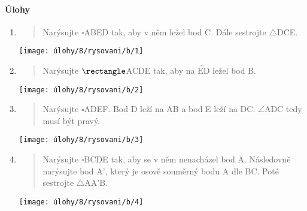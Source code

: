 \paragraph{Úlohy}
\begin{enumerate}
    \item
    \begin{minipage}[t]{\linewidth}
        \begin{quote}
            Narýsujte $\square$ABED tak, aby v něm ležel bod C. Dále sestrojte $\triangle$DCE\@.
        \end{quote}
        \centering
        \texttt{[image: úlohy/8/rysovani/b/1]}

    \end{minipage}

    \item
    \begin{minipage}[t]{\linewidth}
        \begin{quote}
            Narýsujte $\rectangle$ACDE tak, aby na $\overleftrightarrow{\text{ED}}$ ležel bod B\@.
        \end{quote}
        \centering
        \texttt{[image: úlohy/8/rysovani/b/2]}

    \end{minipage}

    \item
    \begin{minipage}[t]{\linewidth}
        \begin{quote}
            Narýsujte $\square$ADEF. Bod D leží na AB a bod E leží na DC. $\angle$ADC tedy musí být pravý.
        \end{quote}
        \centering
        \texttt{[image: úlohy/8/rysovani/b/3]}

    \end{minipage}

    \item
    \begin{minipage}[t]{\linewidth}
        \begin{quote}
            Narýsujte $\square$BCDE tak, aby se v něm nenacházel bod A. Následovně narýsujte bod A', který je osově souměrný bodu A dle BC.
            Poté sestrojte $\triangle$AA'B.
        \end{quote}
        \centering
        \texttt{[image: úlohy/8/rysovani/b/4]}

    \end{minipage}


\end{enumerate}
